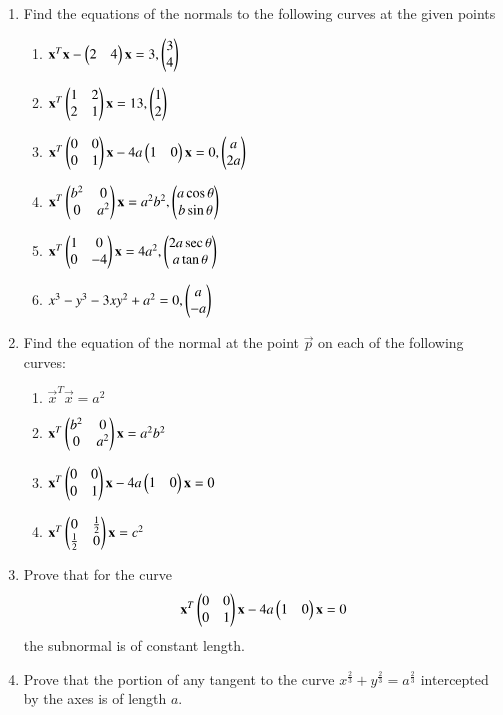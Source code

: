 \renewcommand{\theequation}{\theenumi}
\begin{enumerate}[label=\arabic*.,ref=\thesubsection.\theenumi]
\item Find the equations of the normals to the following curves at the given points
\begin{enumerate}
\item
$
\mathbf{x}^T\mathbf{x}- \begin{pmatrix}2 & 4\end{pmatrix}\mathbf{x}=3, \begin{pmatrix}3\\4\end{pmatrix}
$
\item
$
\mathbf{x}^T\begin{pmatrix}1 & 2\\ 2 & 1\end{pmatrix}\mathbf{x} = 13, \begin{pmatrix}1\\2\end{pmatrix}
$
\item
$
\mathbf{x}^T\begin{pmatrix}0 & 0 \\ 0 & 1\end{pmatrix}\mathbf{x}-4a\begin{pmatrix}1 & 0\end{pmatrix}\mathbf{x}=0, \begin{pmatrix}a\\2a\end{pmatrix}
$
\item
$
\mathbf{x}^T\begin{pmatrix}b^2 & 0\\0 & a^2\end{pmatrix}\mathbf{x}=a^2b^2, \begin{pmatrix}a\cos\theta\\b\sin\theta\end{pmatrix}
$
\item
$
\mathbf{x}^T\begin{pmatrix}1 & 0\\0&-4\end{pmatrix}\mathbf{x} = 4a^2, \begin{pmatrix}2a\sec\theta\\a\tan\theta\end{pmatrix}
$
\item
$
x^3-y^3-3xy^2+a^2 = 0, \begin{pmatrix}a\\-a\end{pmatrix}
$
\end{enumerate}
\item Find the equation of the normal at the point $\vec{p}$ on each of the following curves:
\begin{enumerate}
\item
$
\vec{x}^T\vec{x} = a^2
$
\item
$
\mathbf{x}^T\begin{pmatrix}b^2 & 0\\0 & a^2\end{pmatrix}\mathbf{x}=a^2b^2
$
\item
$
\mathbf{x}^T\begin{pmatrix}0 & 0 \\ 0 & 1\end{pmatrix}\mathbf{x}-4a\begin{pmatrix}1 & 0\end{pmatrix}\mathbf{x}=0
$
\item
$
\mathbf{x}^T\begin{pmatrix}0 & \frac{1}{2}\\ \frac{1}{2} & 0\end{pmatrix}\mathbf{x}=c^2
$
\end{enumerate}
\item Prove that for the curve 
\begin{align}
\mathbf{x}^T\begin{pmatrix}0 & 0 \\ 0 & 1\end{pmatrix}\mathbf{x}-4a\begin{pmatrix}1 & 0\end{pmatrix}\mathbf{x}=0
\end{align}
the subnormal is of constant length.
\item Prove that the portion of any tangent to the curve $x^{\frac{2}{3}}+y^{\frac{2}{3}}=a^{\frac{2}{3}}$ intercepted by the axes is of length $a$.

\end{enumerate}
